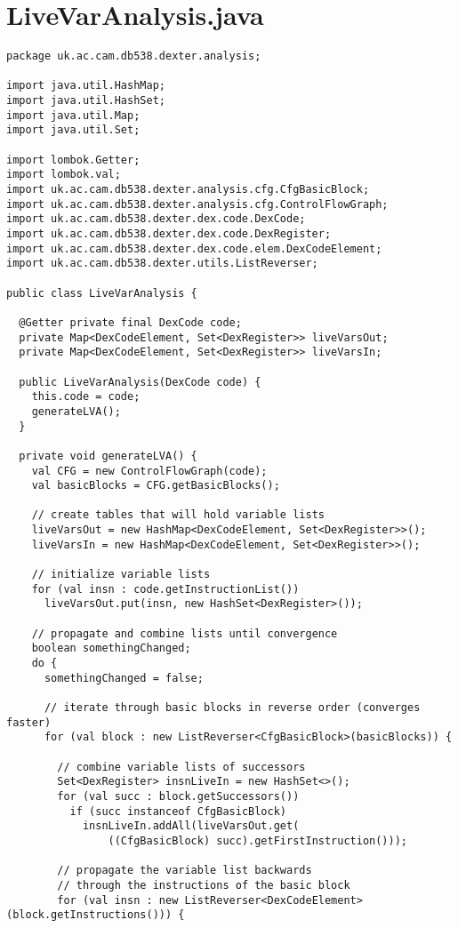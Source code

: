 \section{LiveVarAnalysis.java}

\begin{lstlisting}
package uk.ac.cam.db538.dexter.analysis;

import java.util.HashMap;
import java.util.HashSet;
import java.util.Map;
import java.util.Set;

import lombok.Getter;
import lombok.val;
import uk.ac.cam.db538.dexter.analysis.cfg.CfgBasicBlock;
import uk.ac.cam.db538.dexter.analysis.cfg.ControlFlowGraph;
import uk.ac.cam.db538.dexter.dex.code.DexCode;
import uk.ac.cam.db538.dexter.dex.code.DexRegister;
import uk.ac.cam.db538.dexter.dex.code.elem.DexCodeElement;
import uk.ac.cam.db538.dexter.utils.ListReverser;

public class LiveVarAnalysis {

  @Getter private final DexCode code;
  private Map<DexCodeElement, Set<DexRegister>> liveVarsOut;
  private Map<DexCodeElement, Set<DexRegister>> liveVarsIn;

  public LiveVarAnalysis(DexCode code) {
    this.code = code;
    generateLVA();
  }

  private void generateLVA() {
	val CFG = new ControlFlowGraph(code);
	val basicBlocks = CFG.getBasicBlocks();

	// create tables that will hold variable lists
    liveVarsOut = new HashMap<DexCodeElement, Set<DexRegister>>();
    liveVarsIn = new HashMap<DexCodeElement, Set<DexRegister>>();
    
    // initialize variable lists
    for (val insn : code.getInstructionList())
      liveVarsOut.put(insn, new HashSet<DexRegister>());

    // propagate and combine lists until convergence
    boolean somethingChanged;
    do {
      somethingChanged = false;

      // iterate through basic blocks in reverse order (converges faster)
      for (val block : new ListReverser<CfgBasicBlock>(basicBlocks)) {

    	// combine variable lists of successors   
        Set<DexRegister> insnLiveIn = new HashSet<>();
        for (val succ : block.getSuccessors())
          if (succ instanceof CfgBasicBlock)
            insnLiveIn.addAll(liveVarsOut.get(
            	((CfgBasicBlock) succ).getFirstInstruction()));

        // propagate the variable list backwards 
        // through the instructions of the basic block 
        for (val insn : new ListReverser<DexCodeElement>(block.getInstructions())) {
        	

\end{lstlisting}
